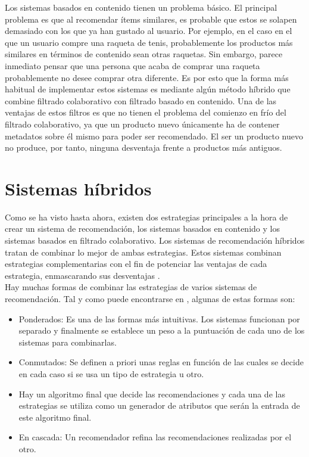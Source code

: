 Los sistemas basados en contenido tienen un problema básico. El principal problema es que al recomendar ítems similares, es probable que estos se solapen demasiado con los que ya han gustado al usuario. Por ejemplo, en el caso en el que un usuario compre una raqueta de tenis, probablemente los productos más similares en términos de contenido sean otras raquetas. Sin embargo, parece inmediato pensar que una persona que acaba de comprar una raqueta probablemente no desee comprar otra diferente. Es por esto que la forma más habitual de implementar estos sistemas es mediante algún método híbrido que combine filtrado colaborativo con filtrado basado en contenido. Una de las ventajas de estos filtros es que no tienen el problema del comienzo en frío del filtrado colaborativo, ya que un producto nuevo únicamente ha de contener metadatos sobre él mismo para poder ser recomendado. El ser un producto nuevo no produce, por tanto, ninguna desventaja frente a productos más antiguos.\\

\section{Sistemas híbridos}\label{sec:hibridos}

Como se ha visto hasta ahora, existen dos estrategias principales a la hora de crear un sistema de recomendación, los sistemas basados en contenido y los sistemas basados en filtrado colaborativo. Los sistemas de recomendación híbridos tratan de combinar lo mejor de ambas estrategias. Estos sistemas combinan estrategias complementarias con el fin de potenciar las ventajas de cada estrategia, enmascarando sus desventajas \cite{CanoMorisio2017}.\\

Hay muchas formas de combinar las estrategias de varios sistemas de recomendación. Tal y como puede encontrarse en \cite{Burke2002}, algunas de estas formas son:

\begin{itemize}
    \item Ponderados: Es una de las formas más intuitivas. Los sistemas funcionan por separado y finalmente se establece un peso a la puntuación de cada uno de los sistemas para combinarlas.
    \item Conmutados: Se definen a priori unas reglas en función de las cuales se decide en cada caso si se usa un tipo de estrategia u otro.
    \item Hay un algoritmo final que decide las recomendaciones y cada una de las estrategias se utiliza como un generador de atributos que serán la entrada de este algoritmo final.
    \item En cascada: Un recomendador refina las recomendaciones realizadas por el otro.
\end{itemize}


